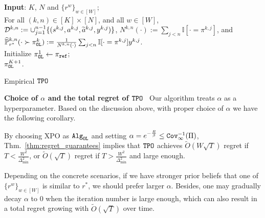 %
\begin{algorithm*}[t]
    \textbf{Input}: $K$, $N$ and $\{r^w\}_{w\in[W]}$; \\

    For all $(k,n) \in [K]\times[N]$, and all $w\in[W]$,
    $\mathcal{D}^{k,n} := \cup_{j=1}^{n-1}\{(s^{k,j}, a^{k,j},\widetilde{a}^{k,j}, y^{k,j})\}$, $N^{k,n}(\cdot) := \sum_{j<n}\mathbb{I}[\cdot = \pi^{k,j}]$, and $\widehat{{\mathbb{P}}}_{r^*}^{k,n}(\cdot \succ \pi^k_{\texttt{OL}}) := \frac{1}{N^{k,n}(\cdot)} \sum_{j<n}\mathbb{I}[\cdot = \pi^{k,j}]y^{k,j}$. \\
    Initialize $\pi^1_{\texttt{OL}} \gets \pi_{\texttt{ref}}$; \\
    \Return $\pi^{K+1}_{\texttt{OL}}$.
    \caption{Empirical ${\texttt{TPO}}$}\label{alg:empirical}
\end{algorithm*}

\textbf{Choice of $\alpha$ and the total regret of ${\texttt{TPO}}$}~
Our algorithm treats $\alpha$ as a hyperparameter. 
Based on the discussion above, with proper choice of $\alpha$ we have the following corollary.
\begin{corollary}\label{coro:total_regret}
    By choosing XPO \citep{xie2024exploratory} as $\texttt{Alg}_{\texttt{OL}}$ and setting $\alpha = e^{-\frac{R}{\beta}} \leq {\texttt{Cov}}_{\infty}^{-1}(\Pi)$, Thm.~\ref{thm:regret_guarantees} implies that ${\texttt{TPO}}$ achieves $\tilde{O}(W\sqrt{T})$ regret if $T < \frac{W^2}{\Delta^2_{\min}}$, or $\tilde{O}(\sqrt{T})$ regret if $T > \frac{W^2}{\Delta^2_{\min}}$ and large enough.
\end{corollary}
Depending on the concrete scenarios, if we have stronger prior beliefs that one of $\{r^w\}_{w\in[W]}$ is similar to $r^*$, we should prefer larger $\alpha$.
Besides, one may gradually decay $\alpha$ to 0 when the iteration number is large enough, which can also result in a total regret growing with $\tilde{O}(\sqrt{T})$ over time.

